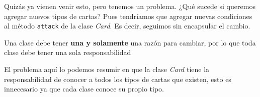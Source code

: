   Quizás ya vienen venir esto, pero tenemos un problema.
  ¿Qué sucede si queremos agregar nuevos tipos de cartas?
  Pues tendríamos que agregar nuevas condiciones al método \texttt{attack} de la clase 
  \textit{Card}.
  Es decir, seguimos sin encapsular el cambio.

  \begin{defaultbox}
    Una clase debe tener \textbf{una y solamente} una razón para cambiar, por lo que toda clase 
    debe tener una sola responsabilidad
  \end{defaultbox}

  El problema aquí lo podemos resumir en que la clase \textit{Card} tiene la responsabilidad de
  conocer a todos los tipos de cartas que existen, esto es innecesario ya que cada clase conoce
  su propio tipo.
